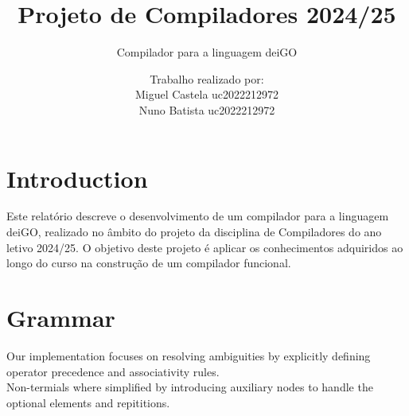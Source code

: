 \documentclass[12pt]{article}
\title{Projeto de Compiladores 2024/25}
\subtitle{Compilador para a linguagem deiGO}
\author{Trabalho realizado por:\\
Miguel Castela uc2022212972 \\
Nuno Batista uc2022212972}
\date{}
\begin{document}
\maketitle

\newpage

\section{Introduction}
Este relatório descreve o desenvolvimento de um compilador para a linguagem deiGO, realizado no âmbito do projeto da disciplina de Compiladores do ano letivo 2024/25. O objetivo deste projeto é aplicar os conhecimentos adquiridos ao longo do curso na construção de um compilador funcional.

\section{Grammar}
    Our implementation focuses on resolving ambiguities by explicitly defining operator precedence and associativity rules.\\ Non-termials where simplified by introducing auxiliary nodes to handle the optional elements and repititions.
\end{document}
